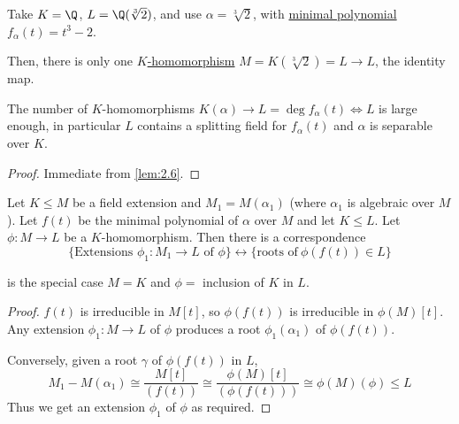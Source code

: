 \documentclass{article}
\begin{document}
\begin{eg}
    Take $K = \Q$, $L = \Q(\sqrt[3]{2})$, and use $\alpha = \sqrt[3]{2}$, with \hyperlink{def:minimalPoly}{minimal polynomial} $f_\alpha(t) = t^3 - 2$.

    Then, there is only one \hyperlink{def:homo}{$K$-homomorphism} $M = K(\sqrt[3]{2})  =L \to L$, the identity map.
\end{eg}

\begin{ncor}\label{cor:2.7}
    The number of $K$-homomorphisms $K(\alpha) \to L = \deg f_\alpha(t) \iff L$ is large enough, in particular $L$ contains a splitting field for $f_\alpha(t)$ and $\alpha$ is separable over $K$.
\end{ncor}

\begin{proof}
    Immediate from \cref{lem:2.6}.
\end{proof}

\begin{nlemma}\label{lem:2.8}
    Let $K \leq M$ be a field extension and $M_1 = M(\alpha_1)$ (where $\alpha_1$ is algebraic over $M$).
    Let $f(t)$ be the minimal polynomial of $\alpha$ over $M$ and let $K \leq L$.
    Let $\phi: M \to L$ be a $K$-homomorphism. Then there is a correspondence
    \begin{equation*}
        \{\text{Extensions } \phi_1:M_1 \to L \text{ of } \phi\} \longleftrightarrow \{\text{roots of} \ \phi(f(t)) \in L\}
    \end{equation*}
    \begin{center}
    \end{center}
\end{nlemma}

\begin{remark}
     is the special case $M=K$ and $\phi =$ inclusion of $K$ in $L$.
\end{remark}

\begin{proof}
    $f(t)$ is irreducible in $M[t]$, so $\phi(f(t))$ is irreducible in $\phi(M)[t]$.
    Any extension $\phi_1: M \to L$ of $\phi$ produces a root $\phi_1(\alpha_1)$ of $\phi(f(t))$.

    Conversely, given a root $\gamma$ of $\phi(f(t))$ in $L$,
    \begin{equation*}
        M_1 - M(\alpha_1) \cong \frac{M[t]}{(f(t))} \cong \frac{\phi(M)[t]}{(\phi(f(t)))} \cong \phi(M)(\phi) \leq L
    \end{equation*}
    Thus we get an extension $\phi_1$ of $\phi$ as required.
\end{proof}
\end{document}
